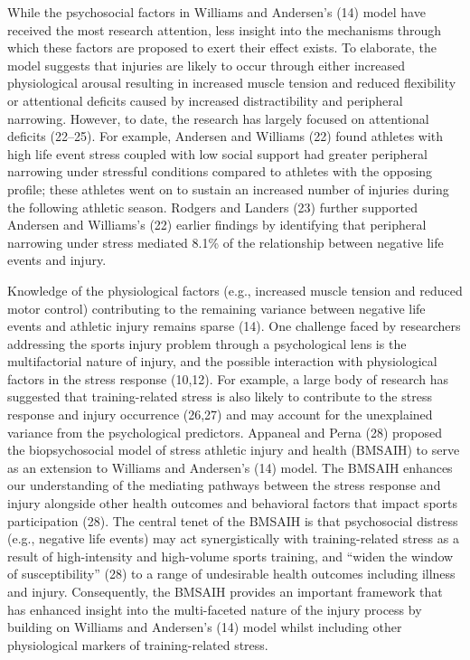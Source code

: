 \documentclass[
  english,
  man]{apa6}
\begin{document}
While the psychosocial factors in Williams and Andersen's (14) model have received the most research attention, less insight into the mechanisms through which these factors are proposed to exert their effect exists. To elaborate, the model suggests that injuries are likely to occur through either increased physiological arousal resulting in increased muscle tension and reduced flexibility or attentional deficits caused by increased distractibility and peripheral narrowing.
However, to date, the research has largely focused on attentional deficits (22--25).
For example, Andersen and Williams (22) found athletes with high life event stress coupled with low social support had greater peripheral narrowing under stressful conditions compared to athletes with the opposing profile; these athletes went on to sustain an increased number of injuries during the following athletic season. Rodgers and Landers (23) further supported Andersen and Williams's (22) earlier findings by identifying that peripheral narrowing under stress mediated 8.1\% of the relationship between negative life events and injury.

Knowledge of the physiological factors (e.g., increased muscle tension and reduced motor control) contributing to the remaining variance between negative life events and athletic injury remains sparse (14). One challenge faced by researchers addressing the sports injury problem through a psychological lens is the multifactorial nature of injury, and the possible interaction with physiological factors in the stress response (10,12). For example, a large body of research has suggested that training-related stress is also likely to contribute to the stress response and injury occurrence (26,27) and may account for the unexplained variance from the psychological predictors. Appaneal and Perna (28) proposed the biopsychosocial model of stress athletic injury and health (BMSAIH) to serve as an extension to Williams and Andersen's (14) model. The BMSAIH enhances our understanding of the mediating pathways between the stress response and injury alongside other health outcomes and behavioral factors that impact sports participation (28). The central tenet of the BMSAIH is that psychosocial distress (e.g., negative life events) may act synergistically with training-related stress as a result of high-intensity and high-volume sports training, and ``widen the window of susceptibility'' (28) to a range of undesirable health outcomes including illness and injury. Consequently, the BMSAIH provides an important framework that has enhanced insight into the multi-faceted nature of the injury process by building on Williams and Andersen's (14) model whilst including other physiological markers of training-related stress.
\end{document}
